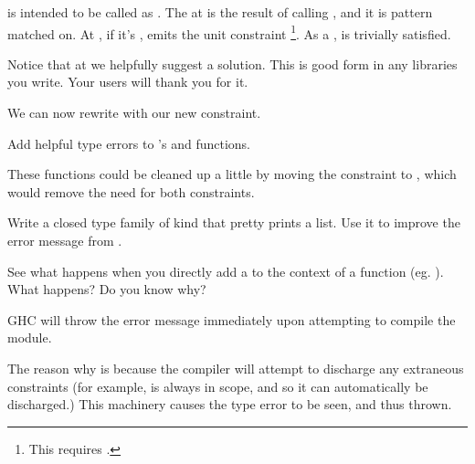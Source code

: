 \documentclass[book.tex]{subfiles}
\begin{document}
 is intended to be called as . The  at  is the result of
calling , and it is pattern matched on. At , if it's
,  emits the unit constraint \ty{()}
\footnote{This requires .}. As a ,
\ty{()} is trivially satisfied.

Notice that at  we helpfully suggest a solution. This is good form in
any libraries you write. Your users will thank you for it.

We can now rewrite  with our new constraint.


\begin{exercise}
Add helpful type errors to 's  and
 functions.
\end{exercise}
\begin{solution}

These functions could be cleaned up a little by moving the 
  constraint to , which would remove the need for both constraints.
\end{solution}

\begin{exercise}
Write a closed type family of kind  that
pretty prints a list. Use it to improve the error message from
.
\end{exercise}
\begin{solution}
\end{solution}

\begin{exercise}
See what happens when you directly add a  to the context
of a function (eg. ). What happens? Do you know
why?
\end{exercise}
\begin{solution}
GHC will throw the error message immediately upon attempting to compile the
  module.

The reason why is because the compiler will attempt to discharge any extraneous
  constraints (for example,  is always in scope, and so it can
  automatically be discharged.) This machinery causes the type error to be seen,
  and thus thrown.
\end{solution}
\end{document}
